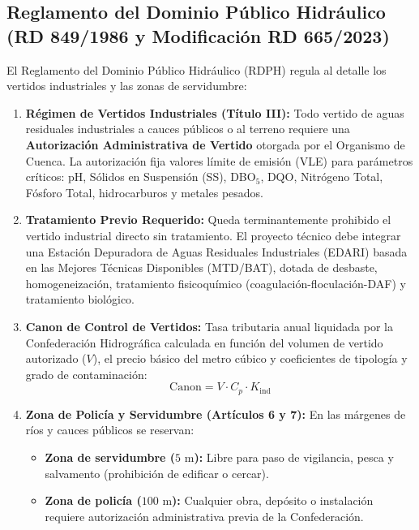 \documentclass{report}
\begin{document}
\subsection{Reglamento del Dominio Público Hidráulico (RD 849/1986 y Modificación RD 665/2023)}
El Reglamento del Dominio Público Hidráulico (RDPH) regula al detalle los vertidos industriales y las zonas de servidumbre:
\begin{enumerate}
    \item \textbf{Régimen de Vertidos Industriales (Título III):}
          Todo vertido de aguas residuales industriales a cauces públicos o al terreno requiere una \textbf{Autorización Administrativa de Vertido} otorgada por el Organismo de Cuenca. La autorización fija valores límite de emisión (VLE) para parámetros críticos: pH, Sólidos en Suspensión (SS), DBO$_5$, DQO, Nitrógeno Total, Fósforo Total, hidrocarburos y metales pesados.
    \item \textbf{Tratamiento Previo Requerido:}
          Queda terminantemente prohibido el vertido industrial directo sin tratamiento. El proyecto técnico debe integrar una Estación Depuradora de Aguas Residuales Industriales (EDARI) basada en las Mejores Técnicas Disponibles (MTD/BAT), dotada de desbaste, homogeneización, tratamiento fisicoquímico (coagulación-floculación-DAF) y tratamiento biológico.
    \item \textbf{Canon de Control de Vertidos:}
          Tasa tributaria anual liquidada por la Confederación Hidrográfica calculada en función del volumen de vertido autorizado ($V$), el precio básico del metro cúbico y coeficientes de tipología y grado de contaminación:
          \begin{equation}
              \text{Canon} = V \cdot C_p \cdot K_{\text{ind}}
          \end{equation}
    \item \textbf{Zona de Policía y Servidumbre (Artículos 6 y 7):}
          En las márgenes de ríos y cauces públicos se reservan:
          \begin{itemize}
              \item \textbf{Zona de servidumbre ($5\text{ m}$):} Libre para paso de vigilancia, pesca y salvamento (prohibición de edificar o cercar).
              \item \textbf{Zona de policía ($100\text{ m}$):} Cualquier obra, depósito o instalación requiere autorización administrativa previa de la Confederación.
          \end{itemize}
\end{enumerate}
\end{document}
